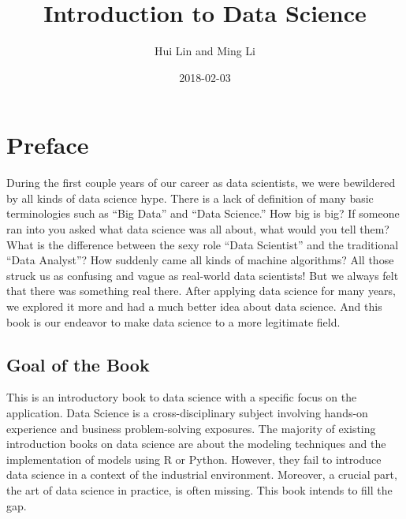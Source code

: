 \documentclass[12pt,]{krantz}
\title{Introduction to Data Science}
\author{Hui Lin and Ming Li}
\date{2018-02-03}
\theoremstyle{definition}
\theoremstyle{definition}
\theoremstyle{remark}
\begin{document}
\maketitle

\thispagestyle{empty}
\begin{center}
\end{center}

\setlength{\abovedisplayskip}{-5pt}
\setlength{\abovedisplayshortskip}{-5pt}

{
\hypersetup{linkcolor=black}
\setcounter{tocdepth}{2}
\tableofcontents
}
\listoftables
\listoffigures
\chapter*{Preface}\label{preface}


During the first couple years of our career as data scientists, we were
bewildered by all kinds of data science hype. There is a lack of
definition of many basic terminologies such as ``Big Data'' and ``Data
Science.'' How big is big? If someone ran into you asked what data
science was all about, what would you tell them? What is the difference
between the sexy role ``Data Scientist'' and the traditional ``Data
Analyst''? How suddenly came all kinds of machine algorithms? All those
struck us as confusing and vague as real-world data scientists! But we
always felt that there was something real there. After applying data
science for many years, we explored it more and had a much better idea
about data science. And this book is our endeavor to make data science
to a more legitimate field.

\section*{Goal of the Book}\label{goal-of-the-book}


This is an introductory book to data science with a specific focus on
the application. Data Science is a cross-disciplinary subject involving
hands-on experience and business problem-solving exposures. The majority
of existing introduction books on data science are about the modeling
techniques and the implementation of models using R or Python. However,
they fail to introduce data science in a context of the industrial
environment. Moreover, a crucial part, the art of data science in
practice, is often missing. This book intends to fill the gap.
\end{document}
